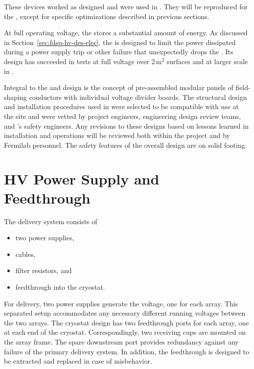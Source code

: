 These devices worked as designed and were used in . They will be reproduced for the ,  except for specific optimizations described in previous sections.

At full operating voltage, the  stores a substantial amount of energy.
As discussed in Section~\ref{sec:fdsp-hv-des-elec}, the  is designed to limit the power dissipated during a power supply trip or other failure that unexpectedly drops the .
Its design has succeeded in tests at full voltage over \num{2}\,m$^2$ surfaces and at larger scale in .  

Integral to the  and  design is the concept of pre-assembled modular panels of field-shaping conductors with individual voltage divider boards. The structural design and installation procedures used in  were selected to be compatible with use at the  site and were vetted by project engineers, engineering design review teams, and 's safety engineers. Any revisions to these designs based on lessons learned in   installation and operations will be reviewed both within the project and by Fermilab  personnel. The safety features of the overall design are on solid footing. 




\section {HV Power Supply and Feedthrough}
\label{sec:fdsp-hv-des-hvps}

The  delivery system consists of
\begin{itemize}
\item two power supplies,
\item {} cables,
\item filter resistors, and
\item {} feedthrough into the cryostat.
\end{itemize}

For  delivery, two power supplies generate the voltage, one for each  array. 
This separated setup accommodates any necessary different running voltages between the two  arrays.
The cryostat design has two feedthrough ports for each  array, one at each end of the cryostat. Correspondingly, two  receiving cups are mounted on the  array frame. The spare downstream port provides redundancy against any failure of the primary  delivery system. In addition, the  feedthrough is designed to be extracted and replaced in case of misbehavior.

